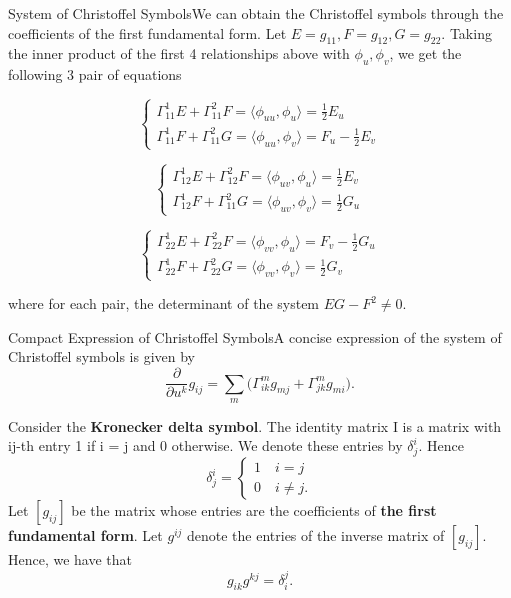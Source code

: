 \documentclass[twoside]{article}
\begin{document}
\begin{proposition_exam}{System of Christoffel Symbols}{}We can obtain the Christoffel symbols through the coefficients of the first fundamental form. Let $E = g_{11}, F = g_{12}, G = g_{22}$. Taking the inner product of the first 4 relationships above with $\phi_u, \phi_v$, we get the following 3 pair of equations  

$$
\begin{cases}
\Gamma_{11}^{1}E + \Gamma_{11}^{2}F = \langle \phi_{uu}, \phi_u \rangle = \frac{1}{2}E_u \\
\Gamma_{11}^{1}F + \Gamma_{11}^{2}G = \langle \phi_{uu}, \phi_v \rangle = F_u - \frac{1}{2}E_v
\end{cases}
$$

$$
\begin{cases}
\Gamma_{12}^{1}E + \Gamma_{12}^{2}F = \langle \phi_{uv}, \phi_u \rangle = \frac{1}{2}E_v \\
\Gamma_{12}^{1}F + \Gamma_{11}^{2}G = \langle \phi_{uv}, \phi_v \rangle = \frac{1}{2}G_u
\end{cases}
$$

$$
\begin{cases}
\Gamma_{22}^{1}E + \Gamma_{22}^{2}F = \langle \phi_{vv}, \phi_u \rangle = F_v - \frac{1}{2}G_u \\
\Gamma_{22}^{1}F + \Gamma_{22}^{2}G = \langle \phi_{vv}, \phi_v \rangle = \frac{1}{2}G_v
\end{cases}
$$

where for each pair, the determinant of the system $EG - F^2 \neq 0.$
\end{proposition_exam}

\begin{theorem_exam}{Compact Expression of Christoffel Symbols}{}A concise expression of the system of Christoffel symbols is given by 
$$
\frac{\partial}{\partial u^k}g_{ij} = \sum_m\bigg(\Gamma_{ik}^mg_{mj} + \Gamma_{jk}^mg_{mi} \bigg).
$$
\end{theorem_exam}

Consider the \textbf{Kronecker delta symbol}. The identity matrix I is a matrix with ij-th entry 1 if i = j and 0 otherwise. We denote these entries by $\delta_{j}^{i}.$ Hence 
$$
\delta_{j}^{i} = 
\begin{cases}
1 \quad i = j\\
0 \quad i \neq j.
\end{cases}
$$
Let $[g_{ij}]$ be the matrix whose entries are the coefficients of \textbf{the first fundamental form}. Let $g^{ij}$ denote the entries of the inverse matrix of $[g_{ij}].$ Hence, we have that 
$$
g_{ik}g^{kj} = \delta_{i}^{j}.
$$
\end{document}
